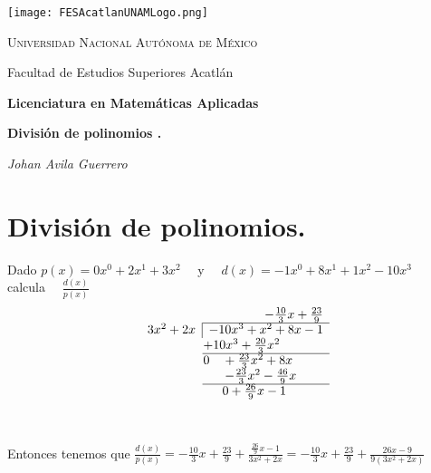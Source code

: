 \documentclass[a4paper,12pt]{article}
\begin{document}
\begin{titlepage}
    \centering
    \texttt{[image: FESAcatlanUNAMLogo.png]} %
    \vspace{1cm}
    
    {\scshape\large Universidad Nacional Autónoma de México \par}
    {\large Facultad de Estudios Superiores Acatlán \par}
    \vspace{1.5cm}
    
    {\Large\bfseries Licenciatura en Matemáticas Aplicadas \par}
    \vspace{2cm}
    
    {\Huge\bfseries  División de polinomios .

    \par}
    \vspace{2cm}
    
    {\Large\itshape Johan Avila Guerrero \par}
    \vfill
    
    
    \vfill
    
\end{titlepage}



\section*{División de polinomios.}

Dado \(  p(x)=0x^0 + 2x^1+3x^2 \quad  \) y \(\quad d(x)= -1x^0 + 8x^1 + 1x^2 - 10x^3 \quad\) calcula \(\quad \frac{d(x)}{p(x)}\) \\





\[
\begin{array}{c|l}
  \multicolumn{2}{r}{-\frac{10}{3}x +\frac{23}{9}} \\
  \cline{2-2}
  3x^2+2x & -10x^3 + x^2 + 8x - 1 \\
  \multicolumn{2}{c}{\quad+10x^3 + \frac{20}{3}x^2 } \\ 
  
  \cline{2-2}
  
  \multicolumn{2}{c}{\qquad 0 \quad + \frac{23}{3}x^2 +8x} \\
  \multicolumn{2}{c}{\qquad \qquad - \frac{23}{3} x^2 - \frac{46}{9}x} \\
  \cline{2-2}
  \multicolumn{2}{c}{\qquad \quad 0 + \frac{26}{9}x-1}  \\
 \end{array}
\]
\\\\

Entonces tenemos que \(\frac{d(x)}{p(x)} = -\frac{10}{3}x + \frac{23}{9}+ \frac{ \frac{26}{9}x-1 }{3x^2+2x} = -\frac{10}{3}x + \frac{23}{9}+ \frac{ 26x-9 }{9(3x^2+2x)}   \) 
\end{document}

